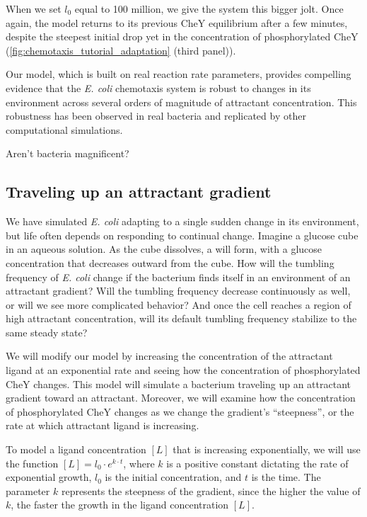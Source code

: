 When we set $l_0$ equal to 100 million, we give the system this bigger jolt. Once again, the model returns to its previous CheY equilibrium after a few minutes, despite the steepest initial drop yet in the concentration of phosphorylated CheY (\autoref{fig:chemotaxis_tutorial_adaptation} (third panel)).

Our model, which is built on real reaction rate parameters, provides compelling evidence that the \textit{E. coli} chemotaxis system is robust to changes in its environment across several orders of magnitude of attractant concentration. This robustness has been observed in real bacteria and replicated by other computational simulations.

Aren't bacteria magnificent?

\subsection{Traveling up an attractant gradient}

We have simulated \textit{E. coli} adapting to a single sudden change in its environment, but life often depends on responding to continual change. Imagine a glucose cube in an aqueous solution. As the cube dissolves, a  will form, with a glucose concentration that decreases outward from the cube. How will the tumbling frequency of \textit{E. coli} change if the bacterium finds itself in an environment of an attractant gradient?  Will the tumbling frequency decrease continuously as well, or will we see more complicated behavior? And once the cell reaches a region of high attractant concentration, will its default tumbling frequency stabilize to the same steady state?

We will modify our model by increasing the concentration of the attractant ligand at an exponential rate and seeing how the concentration of phosphorylated CheY changes. This model will simulate a bacterium traveling up an attractant gradient toward an attractant. Moreover, we will examine how the concentration of phosphorylated CheY changes as we change the gradient's ``steepness'', or the rate at which attractant ligand is increasing.


To model a ligand concentration $[L]$ that is increasing exponentially, we will use the function $[L] = l_0 \cdot e^{k \cdot t}$, where $k$ is a positive constant dictating the rate of exponential growth, $l_0$ is the initial concentration, and $t$ is the time. The parameter $k$ represents the steepness of the gradient, since the higher the value of $k$, the faster the growth in the ligand concentration $[L]$.

